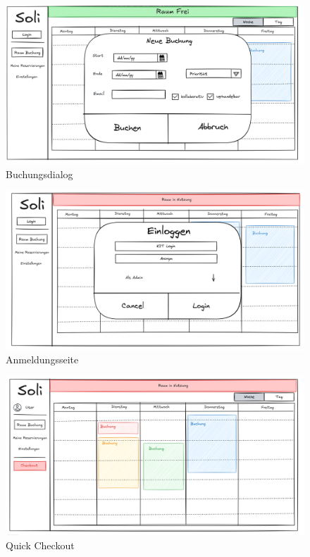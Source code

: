 \begin{figure}[ht]
    \centering
    \includegraphics[scale=0.15]{figures/ui/buchungsdialog.png}
    \caption{Buchungsdialog}
    \label{fig:buchung}
\end{figure}

\begin{figure}[ht]
    \centering
    \includegraphics[scale=0.15]{figures/ui/anmeldungsseite.png}
    \caption{Anmeldungsseite}
    \label{fig:login}
\end{figure}
\clearpage
\begin{figure}[ht]
    \centering
    \includegraphics[scale=0.15]{figures/ui/checkout.png}
    \caption{Quick Checkout}
    \label{fig:checkout}
\end{figure}
\clearpage
